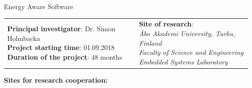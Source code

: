 \documentclass{article}
\begin{document}
\huge{Energy Aware Software}

\begin{table}[h]
\begin{tabular}{  l  l  }
\pbox{15cm}{\normalsize\textbf{Principal investigator}: Dr. Simon Holmbacka\\\textbf{Project starting time}: 01.09.2018\\\textbf{Duration of the project}: 48 months\\} & 
\pbox{10cm}{\textbf{Site of research}:\\\textit{\AA{}bo Akademi University, Turku, Finland}\\\textit{Faculty of Science and Engineering}\\\textit{Embedded Systems Laboratory}}
 
\end{tabular}
\label{tab:strconf}
\end{table}
\normalsize
\textbf{Sites for research cooperation:}
\end{document}
